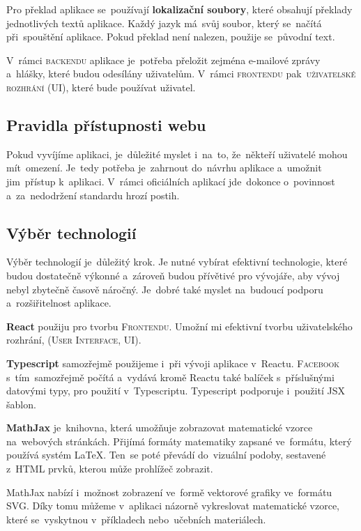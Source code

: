 \documentclass[14pt,a4paper]{article}
\begin{document}
        Pro překlad aplikace se~používají \textbf{lokalizační soubory}, které obsahují překlady jednotlivých textů aplikace. Každý jazyk má~svůj soubor, který se~načítá při~spouštění aplikace. Pokud překlad není nalezen, použije se~původní text.

        V~rámci \textsc{backendu} aplikace je~potřeba přeložit zejména e-mailové zprávy a~hlášky, které budou odesílány uživatelům. V~rámci \textsc{frontendu} pak~\textsc{uživatelské rozhrání (UI)}, které bude používat uživatel.

        \subsection{Pravidla přístupnosti webu}
        Pokud vyvíjíme aplikaci, je~důležité myslet i~na~to, že~někteří uživatelé mohou mít~omezení. Je~tedy potřeba je~zahrnout do~návrhu aplikace a~umožnit jim~přístup k~aplikaci. V~rámci oficiálních aplikací jde~dokonce o~povinnost a~za~nedodržení standardu hrozí postih.


        \subsection{Výběr technologií}
            Výběr technologií je~důležitý krok. Je nutné vybírat efektivní technologie, které budou dostatečně výkonné a~zároveň budou
            přívětivé pro vývojáře, aby vývoj nebyl zbytečně časově náročný. Je~dobré také myslet na~budoucí podporu a~rozšiřitelnost aplikace.

            \textbf{React} použiju pro tvorbu \textsc{Frontendu}. Umožní mi efektivní tvorbu uživatelského rozhrání, (\textsc{User Interface, UI}).

            \textbf{Typescript} samozřejmě použijeme i~při vývoji aplikace v~Reactu. \textsc{Facebook} s~tím~samozřejmě počítá a~vydává
            kromě Reactu také balíček s~příslušnými datovými typy, pro použití v~Typescriptu. Typescript podporuje i~použití JSX šablon. \parencite[Refeerence/Handbook/JSX]{TypeScript}

            \textbf{MathJax} je~knihovna, která umožňuje zobrazovat matematické vzorce na~webových stránkách.
            Přijímá formáty matematiky zapsané ve~formátu, který používá systém \LaTeX. Ten~se poté převádí do~vizuální podoby, sestavené z~HTML prvků, kterou může prohlížeč zobrazit.
            
            MathJax nabízí i~možnost zobrazení ve~formě vektorové grafiky ve~formátu SVG.
            Díky tomu můžeme v~aplikaci názorně vykreslovat matematické vzorce, které se~vyskytnou v~příkladech nebo~učebních materiálech.\parencite{abclinuxuMatematickxE9Vzorce}
\end{document}

